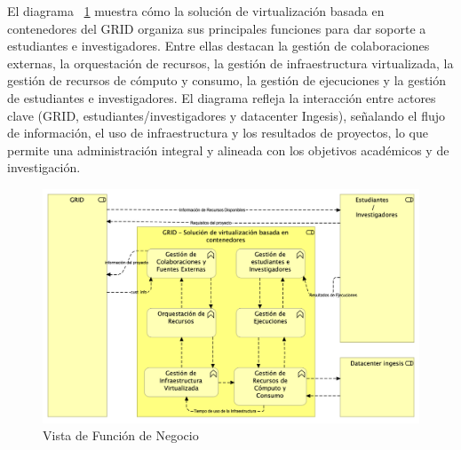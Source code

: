 El diagrama ~\ref{fig:vista-funcion-negocio}  muestra cómo la solución de virtualización basada en contenedores del GRID organiza sus principales funciones para dar soporte a estudiantes e investigadores. Entre ellas destacan la gestión de colaboraciones externas, la orquestación de recursos, la gestión de infraestructura virtualizada, la gestión de recursos de cómputo y consumo, la gestión de ejecuciones y la gestión de estudiantes e investigadores. El diagrama refleja la interacción entre actores clave (GRID, estudiantes/investigadores y datacenter Ingesis), señalando el flujo de información, el uso de infraestructura y los resultados de proyectos, lo que permite una administración integral  y alineada con los objetivos académicos y de investigación.

\begin{figure}[H]
    \centering
    \includegraphics[width=\textwidth]{tablas-images/cp6/Business-Function-View.png}
    \caption{Vista de Función de Negocio}\label{fig:vista-funcion-negocio}
\end{figure}